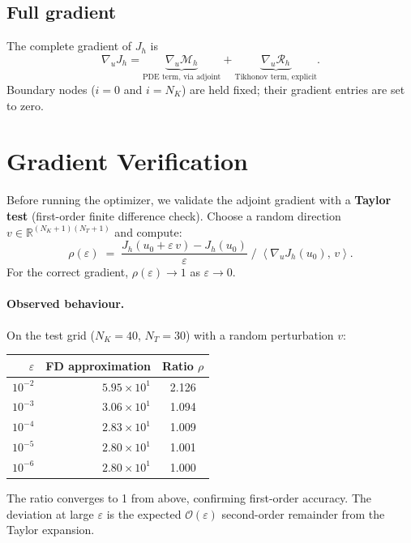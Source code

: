 \documentclass[11pt, a4paper]{article}
\newcommand{\R}{\mathbb{R}}
\newcommand{\inner}[2]{\left\langle #1,\, #2 \right\rangle}
\theoremstyle{definition}
\theoremstyle{plain}
\begin{document}
\subsection{Full gradient}

The complete gradient of $J_h$ is
\begin{equation}\label{eq:grad_total}
  \nabla_u J_h = \underbrace{\nabla_u \mathcal{M}_h}_{\text{PDE term, via adjoint}}
               + \underbrace{\nabla_u \mathcal{R}_h}_{\text{Tikhonov term, explicit}}.
\end{equation}
Boundary nodes ($i=0$ and $i=N_K$) are held fixed; their gradient entries
are set to zero.

\section{Gradient Verification}

Before running the optimizer, we validate the adjoint gradient with a
\textbf{Taylor test} (first-order finite difference check). Choose a random
direction $v \in \R^{(N_K+1)(N_T+1)}$ and compute:
\begin{equation}\label{eq:taylor_test}
  \rho(\varepsilon)
  \;=\;
  \frac{J_h(u_0 + \varepsilon\,v) - J_h(u_0)}{\varepsilon}
  \;\Big/\;
  \inner{\nabla_u J_h(u_0)}{v}.
\end{equation}
For the correct gradient, $\rho(\varepsilon) \to 1$ as $\varepsilon \to 0$.

\paragraph{Observed behaviour.}
On the test grid ($N_K = 40$, $N_T = 30$) with a random perturbation $v$:
\begin{center}
\begin{tabular}{rrc}
\toprule
$\varepsilon$ & FD approximation & Ratio $\rho$ \\
\midrule
$10^{-2}$ & $5.95 \times 10^1$ & 2.126 \\
$10^{-3}$ & $3.06 \times 10^1$ & 1.094 \\
$10^{-4}$ & $2.83 \times 10^1$ & 1.009 \\
$10^{-5}$ & $2.80 \times 10^1$ & 1.001 \\
$10^{-6}$ & $2.80 \times 10^1$ & 1.000 \\
\bottomrule
\end{tabular}
\end{center}
The ratio converges to 1 from above, confirming first-order accuracy.
The deviation at large $\varepsilon$ is the expected $\mathcal{O}(\varepsilon)$
second-order remainder from the Taylor expansion.
\end{document}
